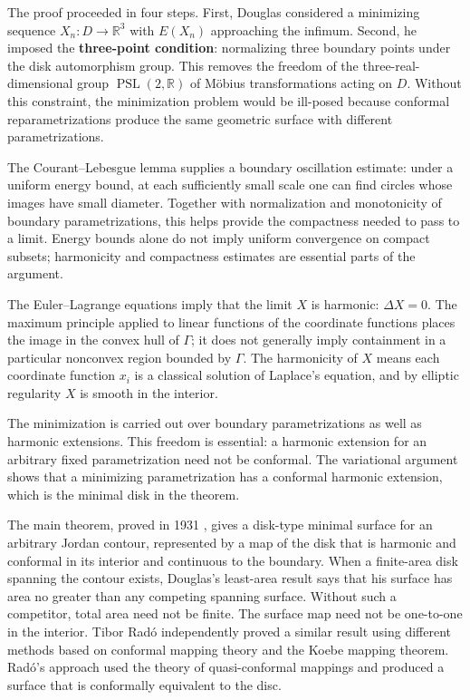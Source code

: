 The proof proceeded in four steps. First, Douglas considered a
minimizing sequence $X_n: D \to \mathbb{R}^3$ with $E(X_n)$ approaching
the infimum. Second, he imposed the \textbf{three-point condition}:
normalizing three boundary points under the disk automorphism group.
This removes the freedom of the three-real-dimensional group
$\operatorname{PSL}(2,\mathbb{R})$ of M\"obius transformations acting on
$D$.
Without this constraint, the minimization problem would be ill-posed
because conformal reparametrizations produce the same geometric surface
with different parametrizations.

The Courant--Lebesgue lemma supplies a boundary oscillation estimate:
under a uniform energy bound, at each sufficiently small scale one can
find circles whose images have small diameter. Together with
normalization and monotonicity of boundary parametrizations, this helps
provide the compactness needed to pass to a limit. Energy bounds alone
do not imply uniform convergence on compact subsets; harmonicity and
compactness estimates are essential parts of the argument.

The Euler--Lagrange equations imply that the limit $X$ is harmonic:
$\Delta X=0$. The maximum principle applied to linear functions of the
coordinate functions places the image in the convex hull of $\Gamma$;
it does not generally imply containment in a particular nonconvex
region bounded by $\Gamma$. The harmonicity of $X$ means each coordinate
function $x_i$ is a classical solution of Laplace's equation, and by
elliptic regularity $X$ is smooth in the interior.

The minimization is carried out over boundary parametrizations as well
as harmonic extensions. This freedom is essential: a harmonic extension
for an arbitrary fixed parametrization need not be conformal. The
variational argument shows that a minimizing parametrization has a
conformal harmonic extension, which is the minimal disk in the theorem.

The main theorem, proved in 1931 \cite{douglas1931}, gives a disk-type minimal surface for
an arbitrary Jordan contour, represented by a map of the disk that is
harmonic and conformal in its interior and continuous to the boundary.
When a finite-area disk spanning the contour exists, Douglas's
least-area result says that his surface has area no greater than any
competing spanning surface. Without such a competitor, total area need
not be finite. The surface map need not be one-to-one in the interior.
Tibor Rad\'{o} independently proved a similar result \cite{rado1930} using different
methods based on conformal mapping theory and the Koebe mapping theorem.
Rad\'{o}'s approach used the theory of quasi-conformal mappings and
produced a surface that is conformally equivalent to the disc.

